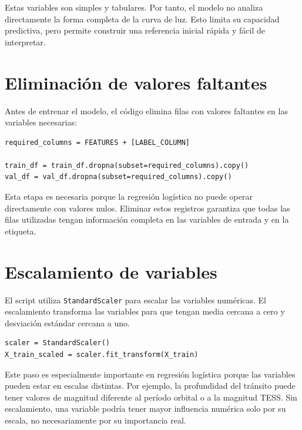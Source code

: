 \documentclass[12pt,letterpaper]{article}
\begin{document}
Estas variables son simples y tabulares. Por tanto, el modelo no analiza directamente la forma completa de la curva de luz. Esto limita su capacidad predictiva, pero permite construir una referencia inicial rápida y fácil de interpretar.

\section{Eliminación de valores faltantes}

Antes de entrenar el modelo, el código elimina filas con valores faltantes en las variables necesarias:

\begin{lstlisting}[style=pythonstyle, caption={Eliminación de valores faltantes}]
required_columns = FEATURES + [LABEL_COLUMN]

train_df = train_df.dropna(subset=required_columns).copy()
val_df = val_df.dropna(subset=required_columns).copy()
\end{lstlisting}

Esta etapa es necesaria porque la regresión logística no puede operar directamente con valores nulos. Eliminar estos registros garantiza que todas las filas utilizadas tengan información completa en las variables de entrada y en la etiqueta.

\section{Escalamiento de variables}

El script utiliza \texttt{StandardScaler} para escalar las variables numéricas. El escalamiento transforma las variables para que tengan media cercana a cero y desviación estándar cercana a uno.

\begin{lstlisting}[style=pythonstyle, caption={Escalamiento de datos}]
scaler = StandardScaler()
X_train_scaled = scaler.fit_transform(X_train)
\end{lstlisting}

Este paso es especialmente importante en regresión logística porque las variables pueden estar en escalas distintas. Por ejemplo, la profundidad del tránsito puede tener valores de magnitud diferente al período orbital o a la magnitud TESS. Sin escalamiento, una variable podría tener mayor influencia numérica solo por su escala, no necesariamente por su importancia real.
\end{document}
